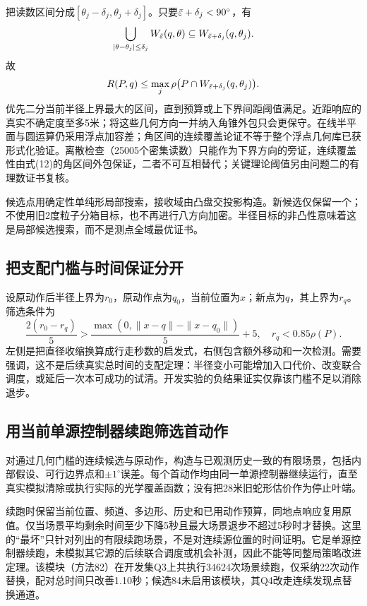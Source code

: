 \documentclass[UTF8,a4paper,zihao=-4,fontset=fandol]{ctexart}
\begin{document}
把读数区间分成$[\theta_j-\delta_j,\theta_j+\delta_j]$。只要$\bar\varepsilon+\delta_j<90^\circ$，有
\begin{equation}
\bigcup_{|\theta-\theta_j|\le\delta_j}W_{\bar\varepsilon}(q,\theta)
\subseteq W_{\bar\varepsilon+\delta_j}(q,\theta_j).
\end{equation}
故
\begin{equation}\label{eq:radiusbound}
R(P,q)\le \max_j\rho\big(P\cap W_{\bar\varepsilon+\delta_j}(q,\theta_j)\big).
\end{equation}
优先二分当前半径上界最大的区间，直到预算或上下界间距阈值满足。近距响应的真实不确定度至多5米；将这些几何方向一并纳入角锥外包只会更保守。在线半平面与圆运算仍采用浮点加容差；角区间的连续覆盖论证不等于整个浮点几何库已获形式化验证。离散检查（25005个密集读数）只能作为下界方向的旁证，连续覆盖性由式(12)的角区间外包保证，二者不可互相替代；关键理论阈值另由问题二的有理数证书复核。

候选点用确定性单纯形局部搜索，接收域由凸盘交投影构造。新候选仅保留一个；不使用旧2度粒子分箱目标，也不再进行八方向加密。半径目标的非凸性意味着这是局部候选搜索，而不是测点全域最优证书。

\subsection{把支配门槛与时间保证分开}
设原动作后半径上界为$r_0$，原动作点为$q_0$，当前位置为$x$；新点为$q$，其上界为$r_q$。筛选条件为
\begin{equation}\frac{2(r_0-r_q)}5 > \frac{\max(0,\|x-q\|-\|x-q_0\|)}5+5,\quad r_q<0.85\rho(P).
\end{equation}
左侧是把直径收缩换算成行走秒数的启发式，右侧包含额外移动和一次检测。需要强调，这不是后续真实总时间的支配定理：半径变小可能增加入口代价、改变联合调度，或延后一次本可成功的试清。开发实验的负结果证实仅靠该门槛不足以消除退步。

\subsection{用当前单源控制器续跑筛选首动作}
对通过几何门槛的连续候选与原动作，构造与已观测历史一致的有限场景，包括内部假设、可行边界点和$\pm1^\circ$误差。每个首动作均由同一单源控制器继续运行，直至真实模拟清除或执行实际的光学覆盖函数；没有把28米旧蛇形估价作为停止叶端。

续跑时保留当前位置、频道、多边形、历史和已用动作预算，同地点响应复用原值。仅当场景平均剩余时间至少下降5秒且最大场景退步不超过5秒时才替换。这里的“最坏”只针对列出的有限续跑场景，不是对连续源位置的时间证明。它是单源控制器续跑，未模拟其它源的后续联合调度或机会补测，因此不能等同整局策略改进定理。该模块（方法82）在开发集Q3上共执行34624次场景续跑，仅采纳22次动作替换，配对总时间只改善1.10秒；候选84未启用该模块，其Q4改走连续发现点替换通道。
\end{document}
